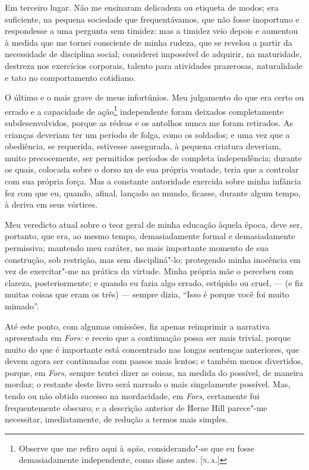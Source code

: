 {{{{{{{{{{{{{{{%
Em terceiro lugar. Não me ensinaram delicadeza ou etiqueta de modos;
era suficiente, na pequena sociedade que frequentávamos, que não fosse
inoportuno e respondesse a uma pergunta sem timidez: mas a timidez veio
depois e aumentou à medida que me tornei consciente de minha rudeza, que
se revelou a partir da necessidade de disciplina social; considerei
impossível de adquirir, na maturidade, destreza nos exercícios
corporais, talento para atividades prazerosas, naturalidade e tato no
comportamento cotidiano.

O último e o mais grave de meus infortúnios. Meu julgamento do que
era certo ou errado e a capacidade de ação\footnote{Observe que me
  refiro aqui à \textit{ação}, considerando"-se que eu fosse demasiadamente
  independente, como disse antes. {[}\textsc{n.\,a.}{]}} independente foram
deixados completamente subdesenvolvidos, porque as rédeas e os antolhos
nunca me foram retirados. As crianças deveriam ter um período de folga,
como os soldados; e uma vez que a obediência, se requerida, estivesse
assegurada, à pequena criatura deveriam, muito precocemente, ser
permitidos períodos de completa independência; durante os quais,
colocada sobre o dorso nu de sua própria vontade, teria que a controlar
com sua própria força. Mas a constante autoridade exercida sobre minha
infância fez com que eu, quando, afinal, lançado ao mundo, ficasse,
durante algum tempo, à deriva em seus vórtices.

Meu veredicto atual sobre o teor geral de minha educação àquela
época, deve ser, portanto, que era, ao mesmo tempo, demasiadamente
formal e demasiadamente permissiva; mantendo meu caráter, no mais
importante momento de sua construção, sob restrição, mas sem
discipliná"-lo; protegendo minha inocência em vez de exercitar"-me na
prática da virtude. Minha própria mãe o percebeu com clareza,
posteriormente; e quando eu fazia algo errado, estúpido ou cruel, --- (e
fiz muitas coisas que eram os três) --- sempre dizia, ``Isso é porque
você foi muito mimado''.

Até este ponto, com algumas omissões, fiz apenas reimprimir a
narrativa apresentada em \textit{Fors:} e receio que a continuação possa
ser mais trivial, porque muito do que é importante está concentrado nas
longas sentenças anteriores, que devem agora ser continuadas com passos
mais lentos; e também menos divertidos, porque, em \textit{Fors,} sempre
tentei dizer as coisas, na medida do possível, de maneira mordaz; o
restante deste livro será narrado o mais singelamente possível. Mas,
tendo ou não obtido sucesso na mordacidade, em \textit{Fors}, certamente
fui frequentemente obscuro; e a descrição anterior de Herne Hill
parece"-me necessitar, imediatamente, de redução a termos mais simples.

}}}}}}}}}}}}}}}
